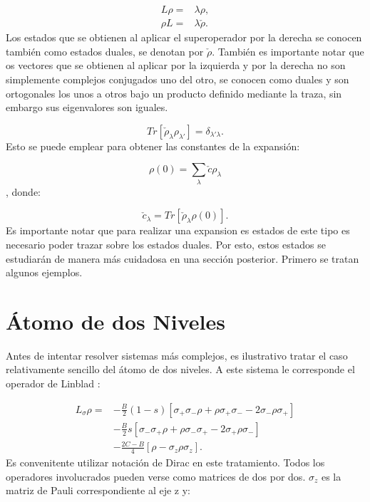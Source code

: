 \documentclass[a4paper,10pt]{report}
\begin{document}
\begin{align*}
L\rho =& \lambda \rho, \\
\rho L =& \lambda \check{\rho}.
\end{align*} Los estados que se obtienen al aplicar el superoperador por la derecha se conocen también como estados duales, se denotan por $\check{\rho}$. También es importante notar que os vectores que se obtienen al aplicar por la izquierda y por la derecha no son simplemente complejos conjugados uno del otro, se conocen como duales y son ortogonales los unos a otros bajo un producto definido mediante la traza\cite{EnglertDB}, sin embargo sus eigenvalores son iguales.

\begin{equation}
Tr[\check{\rho}_\lambda \rho_{\lambda'}] = \delta_{\lambda'\lambda}.
\end{equation} Esto se puede emplear para obtener las constantes de la expansión:

\begin{equation}
\rho(0) = \sum_{\lambda} \check{c} \rho_{\lambda}
\end{equation}, donde:

\begin{equation}
\check{c}_\lambda = Tr[\check{\rho}_\lambda \rho(0)].
\end{equation} Es importante notar que para realizar una expansion es estados de este tipo es necesario poder trazar sobre los estados duales. Por esto, estos estados se estudiarán de manera más cuidadosa en una sección posterior. Primero se tratan algunos ejemplos.

\section{Átomo de dos Niveles}

Antes de intentar resolver sistemas más complejos, es ilustrativo tratar el caso relativamente sencillo del átomo de dos niveles. A este sistema le corresponde el operador de Linblad \cite{EnglertDB}:

\begin{align}\label{TwoLevel}
 L_{\sigma}\rho = 
 &-\frac{B}{2}(1-s)[\sigma_+\sigma_-\rho + \rho\sigma_+\sigma_--2\sigma_-\rho\sigma_+ ]\nonumber\\
 &-\frac{B}{2}s[\sigma_-\sigma_+\rho + \rho\sigma_-\sigma_+-2\sigma_+\rho\sigma_- ]\nonumber\\
 &-\frac{2C-B}{4}[\rho - \sigma_z\rho\sigma_z].
\end{align} Es convenitente utilizar notación de Dirac en este tratamiento. Todos los operadores involucrados pueden verse como matrices de dos por dos. $\sigma_z$ es la matriz de Pauli correspondiente al eje z y:
\end{document}
